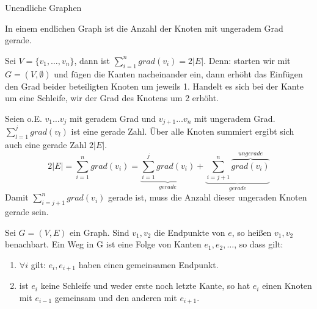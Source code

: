 \begin{beispiel}
	Unendliche Graphen
	
\end{beispiel}


\begin{bemerkung}
	In einem endlichen Graph ist die Anzahl der Knoten mit ungeradem Grad gerade.
\end{bemerkung}


\begin{beweis}
	Sei $V = \{ v_1, \dots, v_n \}$, dann ist $\sum_{i=1}^n grad(v_i) = 2 |E|$. Denn: starten wir mit $G = (V, \emptyset)$ und fügen die Kanten nacheinander ein, dann erhöht das Einfügen den Grad beider beteiligten Knoten um jeweils 1. Handelt es sich bei der Kante um eine Schleife, wir der Grad des Knotens um 2 erhöht.
	
	Seien o.E. $v_1 \dots v_j$ mit geradem Grad und $v_{j+1} \dots v_n$ mit ungeradem Grad. $\sum_{l=1}^j grad(v_l)$ ist eine gerade Zahl. Über alle Knoten summiert ergibt sich auch eine gerade Zahl $2|E|$.
	$$ 2|E| = \sum_{i=1}^n grad(v_i) = \underbrace{\sum_{i=1}^j grad(v_i)}_{gerade} + \underbrace{\sum_{i=j+1}^n \overbrace{grad(v_i)}^{ungerade}}_{gerade} $$
	Damit $\sum_{i=j+1}^n grad(v_i)$ gerade ist, muss die Anzahl dieser ungeraden Knoten gerade sein.
\end{beweis}


\begin{definition}
	
	Sei $G = (V,E)$ ein Graph. Sind $v_1, v_2$ die Endpunkte von $e$, so heißen $v_1, v_2$ benachbart. Ein Weg in G ist eine Folge von Kanten $e_1, e_2, \dots$, so dass gilt:
	\begin{enumerate}
		\item $\forall i$ gilt: $e_i, e_{i+1}$ haben einen gemeinsamen Endpunkt.
		\item ist $e_i$ keine Schleife und weder erste noch letzte Kante, so hat $e_i$ einen Knoten mit $e_{i-1}$ gemeinsam und den anderen mit $e_{i+1}$.
	\end{enumerate}
\end{definition}	


